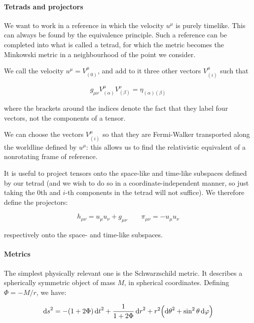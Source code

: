 \documentclass[main.tex]{subfiles}
\begin{document}
\paragraph{Tetrads and projectors}

We want to work in a reference in which the velocity $u^\mu$ is purely timelike. This can always be found by the equivalence principle. Such a reference can be completed into what  is called a tetrad, for which the metric becomes the Minkowski metric in a neighbourhood of the point we consider.

We call the velocity \(u^\mu = V^\mu _{(0)}\), and add to it three other vectors \(V^\mu_{(i)}\) such that

\begin{equation}
    g_{\mu\nu} V^\mu _{(\alpha)} V^\nu _{(\beta)} = \eta_{(\alpha) (\beta)}
\end{equation}

where the brackets around the indices denote the fact that they label four vectors, not the components of a tensor.

We can choose the vectors \(V_{(i)}^\mu\) so that they are Fermi-Walker transported along the worldline defined by \(u^\mu\): this allows us to find the relativistic equivalent of a nonrotating frame of reference.

It is useful to project tensors onto the space-like and time-like subspaces defined by our tetrad (and we wish to do so in a coordinate-independent manner,  so just taking the 0th and $i $-th components in the tetrad will not suffice). We therefore define the projectors:

\begin{equation}
    h_{\mu \nu} = u_\mu u_\nu + g_{\mu \nu} \qquad \pi_{\mu\nu} = -u_\mu u_\nu
\end{equation}

respectively onto the space- and time-like subspaces.

\paragraph{Metrics}

The simplest physically relevant one is the Schwarzschild metric. It describes a spherically symmetric object of mass $M$, in spherical coordinates. Defining $\Phi = -M/r$, we have:

\begin{equation}
    \dd{s}^2 = -(1+2\Phi)\dd{t}^2 + \frac{1}{1+2\Phi} \dd{r}^2
    + r^2 \qty(\dd{\theta}^2 + \sin^2\theta \dd{\varphi}) \label{eq:schwartzshild-line-element}
\end{equation}
\end{document}
